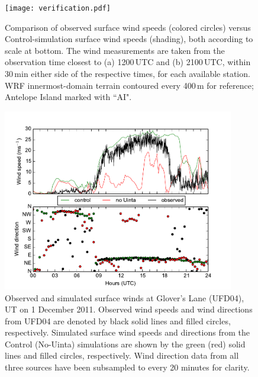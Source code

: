 \documentclass[pdftex,12pt]{article}
\begin{document}
\begin{figure}[t]
\centering
\texttt{[image: verification.pdf]}
\caption{Comparison of observed surface wind speeds (colored circles) versus Control-simulation surface wind speeds (shading), both according to scale at bottom. The wind measurements are taken from the observation time closest to (a) 1200\,UTC and (b) 2100\,UTC, within 30\,min either side of the respective times, for each available station. WRF innermost-domain terrain contoured every 400\,m for reference; Antelope Island marked with ``AI".}
\label{fig:verif}
\end{figure}

\begin{figure}[p]
\centering
\includegraphics[width=0.9\textwidth]{GloversLane_ts}
\caption{Observed and simulated surface winds at Glover's Lane (UFD04), UT on 1 December 2011. Observed wind speeds and wind directions from UFD04 are denoted by black solid lines and filled circles, respectively. Simulated surface wind speeds and directions from the Control (No-Uinta) simulations are shown by the green (red) solid lines and filled circles, respectively. Wind direction data from all three sources have been subsampled to every 20 minutes for clarity.}
\label{fig:glove_ts}
\end{figure}
\end{document}
